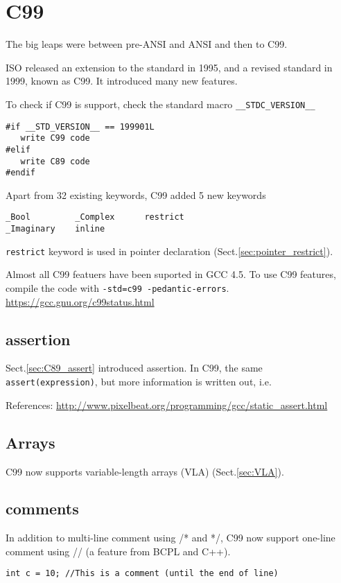 \section{C99}
\label{sec:C99}

The big leaps were between pre-ANSI and ANSI and then to C99. 

ISO released an extension to the standard in 1995, and a revised standard in
1999, known as C99. It introduced many new features.

To check if C99 is support, check the standard macro \verb!__STDC_VERSION__!
\begin{verbatim}
#if __STD_VERSION__ == 199901L
   write C99 code
#elif 
   write C89 code
#endif       
\end{verbatim}

Apart from 32 existing keywords, C99 added 5 new keywords
\begin{verbatim}
_Bool         _Complex      restrict
_Imaginary    inline 
\end{verbatim}
\verb!restrict! keyword is used in pointer declaration
(Sect.\ref{sec:pointer_restrict}).

Almost all C99 featuers have been suported in GCC 4.5. To use C99 features,
compile the code with \verb!-std=c99 -pedantic-errors!.
\url{https://gcc.gnu.org/c99status.html}



\subsection{assertion}
\label{sec:C99_assert}

Sect.\ref{sec:C89_assert} introduced assertion. In C99, the same
\verb!assert(expression)!, but more information is written out, i.e. 

References: \url{http://www.pixelbeat.org/programming/gcc/static_assert.html}

\subsection{Arrays}

C99 now supports  variable-length arrays (VLA) (Sect.\ref{sec:VLA}). 

\subsection{comments}

In addition to multi-line comment using /* and */, C99 now support one-line
comment using // (a feature from BCPL and C++).
\begin{lstlisting}
int c = 10; //This is a comment (until the end of line)

\end{lstlisting}

